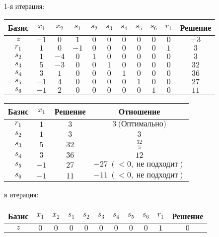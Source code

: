 \documentclass{article}%
\begin{document}
\begin{flushleft}%
1{-}я итерация: %
\newline%
\newline%
\renewcommand{\arraystretch}{1.3}%
\begin{tabular}{|c|ccccccccc|c|}%
\hline%
Базис&$x_{1}$&$x_{2}$&$s_{1}$&$s_{2}$&$s_{3}$&$s_{4}$&$s_{5}$&$s_{6}$&$r_{1}$&Решение\\%
\hline%
$z$&$-1$&$0$&$1$&$0$&$0$&$0$&$0$&$0$&$0$&$-3$\\%
\hline%
$r_{1}$&$1$&$0$&$-1$&$0$&$0$&$0$&$0$&$0$&$1$&$3$\\%
$s_{2}$&$1$&$-4$&$0$&$1$&$0$&$0$&$0$&$0$&$0$&$3$\\%
$s_{3}$&$5$&$-3$&$0$&$0$&$1$&$0$&$0$&$0$&$0$&$32$\\%
$s_{4}$&$3$&$1$&$0$&$0$&$0$&$1$&$0$&$0$&$0$&$36$\\%
$s_{5}$&$-1$&$4$&$0$&$0$&$0$&$0$&$1$&$0$&$0$&$27$\\%
$s_{6}$&$-1$&$2$&$0$&$0$&$0$&$0$&$0$&$1$&$0$&$11$\\%
\hline%
\end{tabular}%
\newline%
\newline%
\newline%
\begin{tabular}{|cccc|}%
\hline%
Базис&$x_{1}$&Решение&Отношение\\%
\hline%
$r_{1}$&$1$&$3$&$3\: \text{(Оптимально)}$\\%
$s_{2}$&$1$&$3$&$3$\\%
$s_{3}$&$5$&$32$&$\frac{32}{5}$\\%
$s_{4}$&$3$&$36$&$12$\\%
$s_{5}$&$-1$&$27$&$-27\: (< 0, \: \text{не подходит})$\\%
$s_{6}$&$-1$&$11$&$-11\: (< 0, \: \text{не подходит})$\\%
\hline%
\end{tabular}%
\newline%
\newline%
я итерация: %
\newline%
\newline%
\renewcommand{\arraystretch}{1.3}%
\begin{tabular}{|c|ccccccccc|c|}%
\hline%
Базис&$x_{1}$&$x_{2}$&$s_{1}$&$s_{2}$&$s_{3}$&$s_{4}$&$s_{5}$&$s_{6}$&$r_{1}$&Решение\\%
\hline%
$z$&$0$&$0$&$0$&$0$&$0$&$0$&$0$&$0$&$1$&$0$\\%

\end{tabular}
\end{flushleft}
\end{document}
